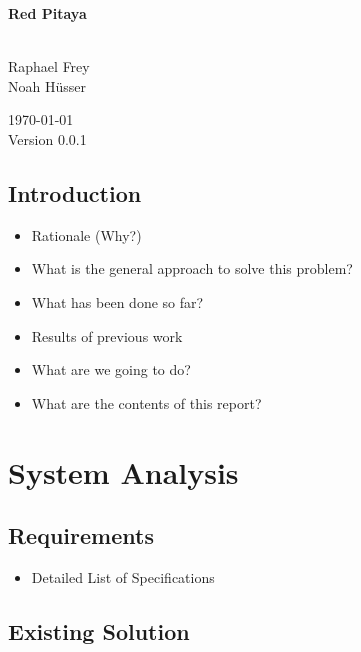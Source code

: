 \documentclass[a4paper,oneside]{alpenthesis/alpenthesis}
\begin{document}
\begin{titlingpage}
    \flushright\sffamily

    \vspace*{5em}
    \Huge\bfseries{Red Pitaya}\\[1ex]
    \Large{}\\[3ex]

    \normalsize\mdseries
    
    \vfill
    Raphael Frey\\
    Noah H\"usser\\[3ex]

    \vspace{5em}

    \today\\
    Version 0.0.1
\end{titlingpage}

\frontmatter
\tableofcontents*

\mainmatter
\chapter{Introduction}
\begin{itemize}\firmlist
    \item Rationale (Why?)
    \item What is the general approach to solve this problem?
    \item What has been done so far?
    \item Results of previous work
    \item What are we going to do?
    \item What are the contents of this report?
\end{itemize}

\part{System Analysis}
\chapter{Requirements}
\begin{itemize}\firmlist
    \item Detailed List of Specifications
\end{itemize}

\chapter{Existing Solution}
\end{document}
